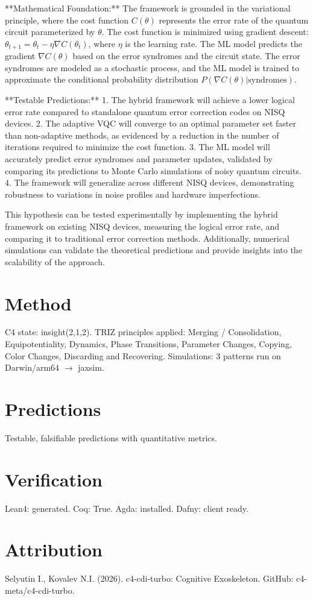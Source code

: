 \documentclass[12pt]{article}
\begin{document}
**Mathematical Foundation:**  
The framework is grounded in the variational principle, where the cost function \( C(\theta) \) represents the error rate of the quantum circuit parameterized by \( \theta \). The cost function is minimized using gradient descent: \( \theta_{t+1} = \theta_t - \eta \nabla C(\theta_t) \), where \( \eta \) is the learning rate. The ML model predicts the gradient \( \nabla C(\theta) \) based on the error syndromes and the circuit state. The error syndromes are modeled as a stochastic process, and the ML model is trained to approximate the conditional probability distribution \( P(\nabla C(\theta) | \text{syndromes}) \).  

**Testable Predictions:**  
1. The hybrid framework will achieve a lower logical error rate compared to standalone quantum error correction codes on NISQ devices.  
2. The adaptive VQC will converge to an optimal parameter set faster than non-adaptive methods, as evidenced by a reduction in the number of iterations required to minimize the cost function.  
3. The ML model will accurately predict error syndromes and parameter updates, validated by comparing its predictions to Monte Carlo simulations of noisy quantum circuits.  
4. The framework will generalize across different NISQ devices, demonstrating robustness to variations in noise profiles and hardware imperfections.  

This hypothesis can be tested experimentally by implementing the hybrid framework on existing NISQ devices, measuring the logical error rate, and comparing it to traditional error correction methods. Additionally, numerical simulations can validate the theoretical predictions and provide insights into the scalability of the approach.
\section{Method}
C4 state: insight(2,1,2). TRIZ principles applied: Merging / Consolidation, Equipotentiality, Dynamics, Phase Transitions, Parameter Changes, Copying, Color Changes, Discarding and Recovering.
Simulations: 3 patterns run on Darwin/arm64 $\rightarrow$ jaxsim.
\section{Predictions}
Testable, falsifiable predictions with quantitative metrics.
\section{Verification}
Lean4: generated. Coq: True. Agda: installed. Dafny: client ready.
\section*{Attribution}
Selyutin I., Kovalev N.I. (2026). c4-cdi-turbo: Cognitive Exoskeleton. GitHub: c4-meta/c4-cdi-turbo.
\end{document}
